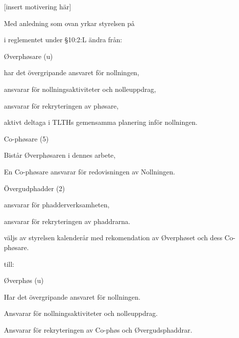 \documentclass[../_main/handlingar.tex]{subfiles}
\begin{document}
[insert motivering här]

\newpage
Med anledning som ovan yrkar styrelsen på

\begin{attsatser}
    \att i reglementet under \S10:2:L ändra från:\par
    \begin{emptylist}
        \item Øverphøsare (u)
            \begin{dashlist}
                \item har det övergripande ansvaret för nollningen,
                \item ansvarar för nollningsaktiviteter och nolleuppdrag,
                \item ansvarar för rekryteringen av phøsare,
                \item aktivt deltaga i TLTHs gemensamma planering inför nollningen.
            \end{dashlist}
        \item Co-phøsare (5)
            \begin{dashlist}
                \item Bistår Øverphøsaren i dennes arbete,
                \item En Co-phøsare ansvarar för redovisningen av Nollningen.
            \end{dashlist}
        \item Övergudphadder (2)
            \begin{dashlist}
                \item ansvarar för phadderverksamheten,
                \item ansvarar för rekryteringen av phaddrarna.
                \item väljs av styrelsen kalenderår med rekomendation av Øverphøset och dess Co-phøsare.
            \end{dashlist}
    \end{emptylist}
    till:
    \begin{emptylist}
        \item Øverphøs (u)
            \begin{dashlist}
                \item Har det övergripande ansvaret för nollningen.
                \item Ansvarar för nollningsaktiviteter och nolleuppdrag.
                \item Ansvarar för rekryteringen av Co-phøs och Øvergudsphaddrar.

\end{dashlist}
\end{emptylist}
\end{attsatser}
\end{document}
